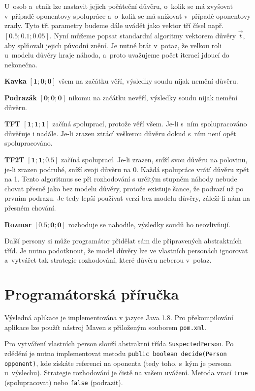 \documentclass[pdftex,a4paper,12pt]{extarticle}
\begin{document}
U~osob a~etnik lze nastavit jejich počáteční důvěru, o~kolik se má zvyšovat v~případě oponentovy spolupráce a~o~kolik se má snižovat v~případě oponentovy zrady. Tyto tři parametry budeme dále uvádět jako vektor tří čísel např. $\mathbf{[0.5; 0.1; 0.05]}$. Nyní můžeme popsat standardní algoritmy vektorem důvěry $\vec{t}$, aby splňovali jejich původní znění. Je nutné brát v~potaz, že velkou roli u~modelu důvěry hraje náhoda, a~proto uvažujeme počet iterací jdoucí do nekonečna. 

\begin{description}
\item \textbf{Kavka} $\mathbf{[1; 0; 0]}$ všem na začátku věří, výsledky soudu nijak nemění důvěru. 
\item \textbf{Podrazák} $\mathbf{[0; 0; 0]}$ nikomu na začátku nevěří, výsledky soudu nijak nemění důvěru.
\item \textbf{TFT} $\mathbf{[1; 1; 1]}$ začíná spoluprací, protože věří všem. Je-li s~ním spolupracováno důvěřuje i nadále. Je-li zrazen ztrácí veškerou důvěru dokud s~ním není opět spolupracováno.
\item \textbf{TF2T} $\mathbf{[1; 1; 0.5]}$ začíná spoluprací. Je-li zrazen, sníží svou důvěru na polovinu, je-li zrazen podruhé, sníží svoji důvěru na 0. Každá spolupráce vrátí důvěru zpět na 1. Tento algoritmus se při rozhodování s určitým stupněm náhody nebude chovat přesně jako bez modelu důvěry, protože existuje šance, že podrazí už po prvním podrazu. Je tedy lepší používat verzi bez modelu důvěry, záleží-li nám na přesném chování.
\item \textbf{Rozmar} $\mathbf{[0.5; 0; 0]}$ rozhoduje se nahodile, výsledky soudů ho neovlivňují. 
\end{description}


Další persony si může programátor přidělat sám dle připravených abstraktních tříd. Je nutno podotknout, že model důvěry lze ve vlastních personách ignorovat a~vytvářet tak strategie rozhodování, které důvěru neberou v~potaz. 

\newpage
\section{Programátorská příručka}
\label{Programátorská příručka}
Výsledná aplikace je implementována v jazyce Java 1.8. Pro překompilování aplikace lze použít nástroj Maven s přiloženým souborem \texttt{pom.xml}.

Pro vytváření vlastních person slouží abstraktní třída \texttt{SuspectedPerson}. Po zdědění je nutno implementovat metodu \texttt{public boolean decide(Person opponent)}, kde získáte referenci na oponenta (tedy toho, s~kým je persona u~výslechu). Strategie rozhodování je čistě na vašem uvážení. Metoda vrací \texttt{true} (spolupracovat) nebo \texttt{false} (podrazit). 
\end{document}
